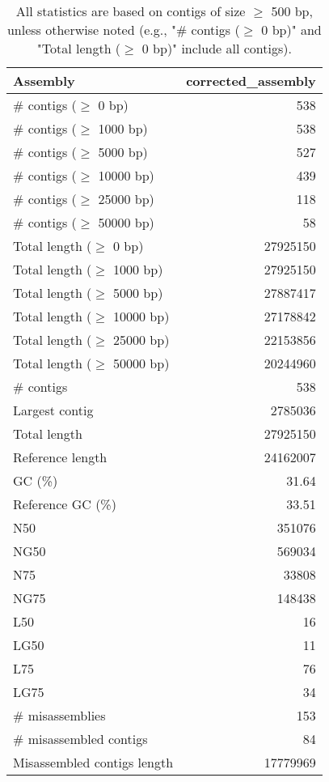 \documentclass[12pt,a4paper]{article}
\begin{document}
\begin{table}[ht]
\begin{center}
\caption{All statistics are based on contigs of size $\geq$ 500 bp, unless otherwise noted (e.g., "\# contigs ($\geq$ 0 bp)" and "Total length ($\geq$ 0 bp)" include all contigs).}
\begin{tabular}{|l*{1}{|r}|}
\hline
Assembly & corrected\_assembly \\ \hline
\# contigs ($\geq$ 0 bp) & 538 \\ \hline
\# contigs ($\geq$ 1000 bp) & 538 \\ \hline
\# contigs ($\geq$ 5000 bp) & 527 \\ \hline
\# contigs ($\geq$ 10000 bp) & 439 \\ \hline
\# contigs ($\geq$ 25000 bp) & 118 \\ \hline
\# contigs ($\geq$ 50000 bp) & 58 \\ \hline
Total length ($\geq$ 0 bp) & 27925150 \\ \hline
Total length ($\geq$ 1000 bp) & 27925150 \\ \hline
Total length ($\geq$ 5000 bp) & 27887417 \\ \hline
Total length ($\geq$ 10000 bp) & 27178842 \\ \hline
Total length ($\geq$ 25000 bp) & 22153856 \\ \hline
Total length ($\geq$ 50000 bp) & 20244960 \\ \hline
\# contigs & 538 \\ \hline
Largest contig & 2785036 \\ \hline
Total length & 27925150 \\ \hline
Reference length & 24162007 \\ \hline
GC (\%) & 31.64 \\ \hline
Reference GC (\%) & 33.51 \\ \hline
N50 & 351076 \\ \hline
NG50 & 569034 \\ \hline
N75 & 33808 \\ \hline
NG75 & 148438 \\ \hline
L50 & 16 \\ \hline
LG50 & 11 \\ \hline
L75 & 76 \\ \hline
LG75 & 34 \\ \hline
\# misassemblies & 153 \\ \hline
\# misassembled contigs & 84 \\ \hline
Misassembled contigs length & 17779969 \\ \hline

\end{tabular}
\end{center}
\end{table}
\end{document}

